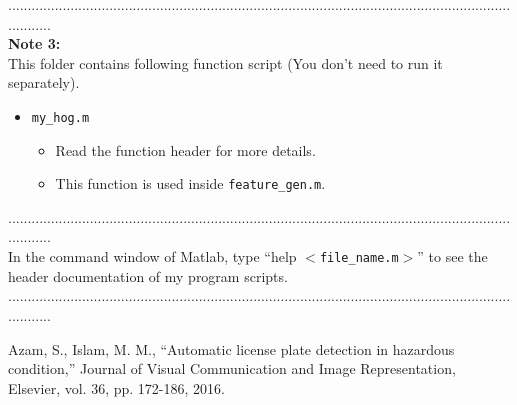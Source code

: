 \documentclass[a4paper,12pt]{article} %
\begin{document}
............................................................................................................................................\\
\textbf{Note 3: }\\
This folder contains following function script (You don't need to run it separately).
\begin{itemize}
	\item \verb|my_hog.m|
		\begin{itemize}
			\item Read the function header for more details.
			\item This function is used inside \verb|feature_gen.m|.
		\end{itemize}
\end{itemize}
............................................................................................................................................\\
In the command window of Matlab, type ``help $<$\verb|file_name.m|$>$'' to see the header documentation of my program scripts.\\
............................................................................................................................................
\begin{thebibliography}{99}
	
	 Azam, S., Islam, M. M., ``Automatic license plate detection in hazardous condition,'' Journal of Visual Communication and Image Representation, Elsevier, vol. 36, pp. 172-186, 2016.

	
\end{thebibliography}
\end{document}

